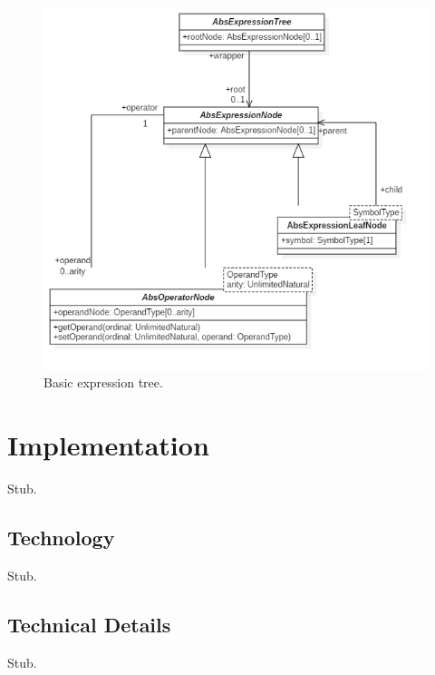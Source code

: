 \documentclass[12pt,oneside,a4paper,notitlepage]{report}
\begin{document}
	\begin{figure}[h]
		\begin{center}
			\includegraphics[width=\textwidth]
			{Models/BasicAbstractExpressionTree}
		\end{center}
		\caption{Basic expression tree.}
		\label{fig:basic-expr-tree}
	\end{figure}

	\newpage

	\section*{Implementation}
	\par Stub.

	\subsection*{Technology}
	\par Stub.

	\subsection*{Technical Details}
	\par Stub.

	\printbibliography[
		title=Sources
	]
\end{document}
